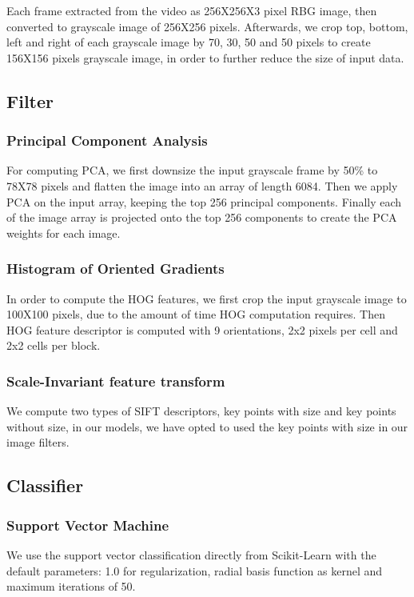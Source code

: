 \documentclass[
	a4paper, %
	10pt, %
	unnumberedsections, %
	twoside, %
]{t0004}
\begin{document}
Each frame extracted from the video as 256X256X3 pixel RBG image, then converted to grayscale image of 256X256 pixels. Afterwards, we crop top, bottom, left and right of each grayscale image by 70, 30, 50 and 50 pixels to create 156X156 pixels grayscale image, in order to further reduce the size of input data.

\subsection{Filter}

\subsubsection{Principal Component Analysis} For computing PCA, we first downsize the input grayscale frame by 50\% to 78X78 pixels and flatten the image into an array of length 6084. Then we apply PCA on the input array, keeping the top 256 principal components. Finally each of the image array is projected onto the top 256 components to create the PCA weights for each image.

\subsubsection{Histogram of Oriented Gradients} In order to compute the HOG features, we first crop the input grayscale image to 100X100 pixels, due to the amount of time HOG computation requires. Then HOG feature descriptor is computed with 9 orientations, 2x2 pixels per cell and 2x2 cells per block.

\subsubsection{Scale-Invariant feature transform} We compute two types of SIFT descriptors, key points with size and key points without size, in our models, we have opted to used the key points with size in our image filters.

\subsection{Classifier}

\subsubsection{Support Vector Machine} We use the support vector classification directly from Scikit-Learn with the default parameters: 1.0 for regularization, radial basis function as kernel and maximum iterations of 50. 
\end{document}
